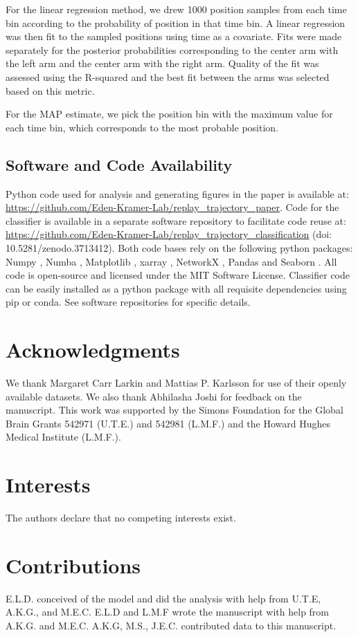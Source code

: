 \documentclass[9pt,lineno]{elife}
\begin{document}
For the linear regression method, we drew 1000 position samples from each time bin according to the probability of position in that time bin. A linear regression was then fit to the sampled positions using time as a covariate. Fits were made separately for the posterior probabilities corresponding to the center arm with the left arm and the center arm with the right arm. Quality of the fit was assessed using the R-squared and the best fit between the arms was selected based on this metric.

For the MAP estimate, we pick the position bin with the maximum value for each time bin, which corresponds to the most probable position.

\subsection*{Software and Code Availability}
Python code used for analysis and generating figures in the paper is available at: \url{https://github.com/Eden-Kramer-Lab/replay_trajectory_paper}. Code for the classifier is available in a separate software repository to facilitate code reuse at: \url{https://github.com/Eden-Kramer-Lab/replay_trajectory_classification} (doi: 10.5281/zenodo.3713412).
Both code bases rely on the following python packages: Numpy \citep{vanderWaltNumPyArrayStructure2011}, Numba \citep{LamNumbaLLVMbasedPython2015}, Matplotlib \citep{HunterMatplotlib2DGraphics2007}, xarray \citep{HoyerxarrayNDlabeled2017}, NetworkX \citep{HagbergExploringNetworkStructure2008}, Pandas \citep{McKinneyDataStructuresStatistical2010} and Seaborn \citep{Waskomseabornstatisticaldata2021}. All code is open-source and licensed under the MIT Software License. Classifier code can be easily installed as a python package with all requisite dependencies using pip or conda. See software repositories for specific details.

\section{Acknowledgments}
We thank Margaret Carr Larkin and Mattias P. Karlsson for use of their openly available datasets. We also thank Abhilasha Joshi for feedback on the manuscript. This work was supported by the Simons Foundation for the Global Brain Grants 542971 (U.T.E.) and 542981 (L.M.F.) and the Howard Hughes Medical Institute (L.M.F.).

\section{Interests}
The authors declare that no competing interests exist.

\section{Contributions}
E.L.D. conceived of the model and did the analysis with help from U.T.E, A.K.G., and M.E.C. E.L.D and L.M.F wrote the manuscript with help from A.K.G. and M.E.C. A.K.G, M.S., J.E.C. contributed data to this manuscript.


\end{document}
